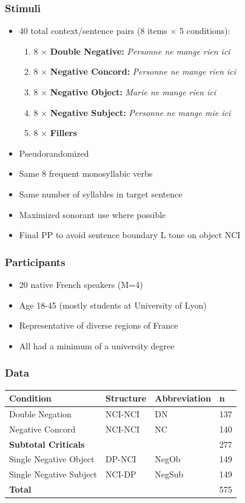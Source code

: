 \documentclass{beamer}
\begin{document}
\begin{frame}
\frametitle{Stimuli}
\begin{itemize}
\item 40 total context/sentence pairs (8 items $\times$ 5 conditions):
\begin{enumerate}
\item 8 $\times$ \textbf{Double Negative:} \textit{\alert{Personne} ne mange \alert{rien} ici}
\item 8 $\times$ \textbf{Negative Concord:} \textit{\alert{Personne} ne mange \alert{rien} ici}
\item8 $\times$ \textbf{Negative Object:} \textit{Marie ne mange \alert{rien} ici}
\item8 $\times$ \textbf{Negative Subject:} \textit{\alert{Personne} ne mange mie ici}
\item 8 $\times$ \textbf{Fillers}
\end{enumerate}
\item Pseudorandomized
\item Same 8 frequent monosyllabic verbs
\item Same number of syllables in target sentence
\item Maximized sonorant use where possible
\item Final PP to avoid sentence boundary L tone on object NCI
\end{itemize}
\end{frame}

\begin{frame}
\frametitle{Participants}
\begin{itemize}
\item 20 native French speakers (M=4)
\item Age 18-45 (mostly students at University of Lyon)
\item Representative of diverse regions of France
\item All had a minimum of a university degree
\end{itemize}
\end{frame}

\begin{frame}
\frametitle{Data}
\begin{center}
\begin{tabular}{ l l l l }
\textbf{Condition} &\textbf{Structure}& \textbf{Abbreviation} & \textbf{n} \\
\hline
Double Negation &NCI-NCI & DN & 137 \\
Negative Concord & NCI-NCI& NC & 140 \\
\hline
\textbf{Subtotal Criticals} & && 277 \\
\hline
Single Negative Object &DP-NCI &NegOb & 149 \\
Single Negative Subject & NCI-DP&NegSub & 149 \\
\hline 
\hline
\textbf{Total} & && 575\\
\end{tabular}
\end{center}

\end{frame}
\end{document}
